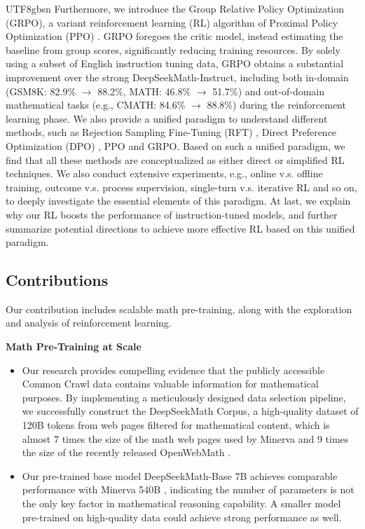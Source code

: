\documentclass[11pt, a4paper, logo, copyright, nonumbering]{deepseek}
\newcommand{\spmath}{DeepSeekMath}
\begin{document}
\begin{CJK*}{UTF8}{gbsn}
Furthermore, we introduce the Group Relative Policy Optimization (GRPO), a variant reinforcement learning (RL) algorithm of Proximal Policy Optimization (PPO) \citep{schulman2017proximal}.
GRPO foregoes the critic model, instead estimating
the baseline from group scores, significantly reducing training resources.
By solely using a subset of English instruction tuning data, GRPO obtains a substantial improvement over the strong DeepSeekMath-Instruct, including both in-domain (GSM8K: 82.9\% $\rightarrow$ 88.2\%, MATH: 46.8\% $\rightarrow$ 51.7\%) and out-of-domain mathematical tasks (e.g., CMATH: 84.6\% $\rightarrow$ 88.8\%) during the reinforcement learning phase.
We also provide a unified paradigm to understand different methods, such as Rejection Sampling Fine-Tuning (RFT) \citep{yuan2023scaling}, Direct Preference Optimization (DPO) \citep{dpo}, PPO and GRPO.
Based on such a unified paradigm, we find that all these methods are conceptualized as either direct or simplified RL techniques. 
We also conduct extensive experiments, e.g., online v.s. offline training, outcome v.s. process supervision, single-turn v.s. iterative RL and so on, to deeply investigate the essential elements of this paradigm.
At last, we explain why our RL boosts the performance of instruction-tuned models, and further summarize potential directions to achieve more effective RL based on this unified paradigm.

\subsection{Contributions}
Our contribution includes scalable math pre-training, along with the exploration and analysis of reinforcement learning.

\noindent
\textbf{Math Pre-Training at Scale}
\begin{itemize}[topsep=0pt]
    \item Our research provides compelling evidence that the publicly accessible Common Crawl data contains valuable information for mathematical purposes.
    By implementing a meticulously designed data selection pipeline, we successfully construct the DeepSeekMath Corpus, a high-quality dataset of 120B tokens from web pages filtered for mathematical content, which is almost 7 times the size of the math web pages used by Minerva \citep{minerva} and 9 times the size of the recently released OpenWebMath \citep{openwebmath}.

    \item Our pre-trained base model \spmath-Base 7B achieves comparable performance with Minerva 540B \citep{minerva}, indicating the number of parameters is not the only key factor in mathematical reasoning capability.
    A smaller model pre-trained on high-quality data could achieve strong performance as well. 


\end{itemize}
\end{CJK*}
\end{document}
